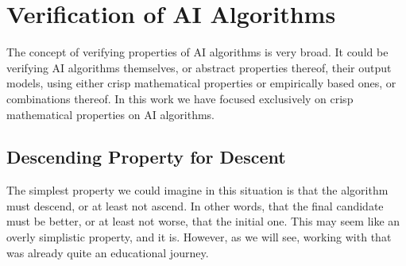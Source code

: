 \documentclass[]{report}
\begin{document}
\section{Verification of AI Algorithms}

The concept of verifying properties of AI algorithms is very broad.
It could be verifying AI algorithms themselves, or abstract properties
thereof, their output models, using either crisp mathematical
properties or empirically based ones, or combinations thereof.  In
this work we have focused exclusively on crisp mathematical properties
on AI algorithms.

\subsection{Descending Property for Descent}
The simplest property we could imagine in this situation is that the
algorithm must descend, or at least not ascend.  In other words, that
the final candidate must be better, or at least not worse, that the
initial one.  This may seem like an overly simplistic property, and it
is.  However, as we will see, working with that was already quite an
educational journey.
\end{document}

